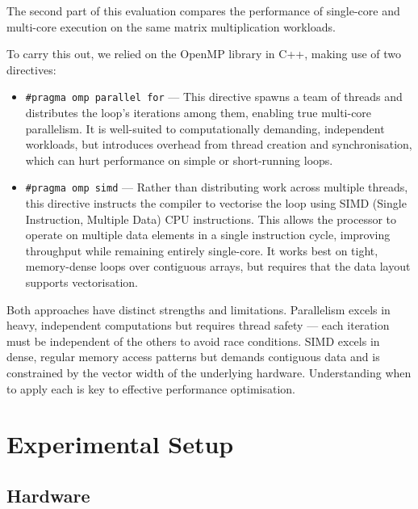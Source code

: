 \documentclass[12pt,a4paper]{article}
\begin{document}
The second part of this evaluation compares the performance of single-core and
multi-core execution on the same matrix multiplication workloads.

To carry this out, we relied on the OpenMP library in C++, making use of two
directives:

\begin{itemize}
  \item \texttt{\#pragma omp parallel for} --- This directive spawns a team of
        threads and distributes the loop's iterations among them, enabling
        true multi-core parallelism. It is well-suited to computationally
        demanding, independent workloads, but introduces overhead from thread
        creation and synchronisation, which can hurt performance on simple or
        short-running loops.

  \item \texttt{\#pragma omp simd} --- Rather than distributing work across
        multiple threads, this directive instructs the compiler to vectorise
        the loop using SIMD (Single Instruction, Multiple Data) CPU
        instructions. This allows the processor to operate on multiple data
        elements in a single instruction cycle, improving throughput while
        remaining entirely single-core. It works best on tight, memory-dense
        loops over contiguous arrays, but requires that the data layout
        supports vectorisation.
\end{itemize}

Both approaches have distinct strengths and limitations. Parallelism excels in
heavy, independent computations but requires thread safety --- each iteration
must be independent of the others to avoid race conditions. SIMD excels in
dense, regular memory access patterns but demands contiguous data and is
constrained by the vector width of the underlying hardware. Understanding when
to apply each is key to effective performance optimisation.

\section{Experimental Setup}
\label{sec:setup}

\subsection{Hardware}
\label{subsec:hw}
\end{document}
